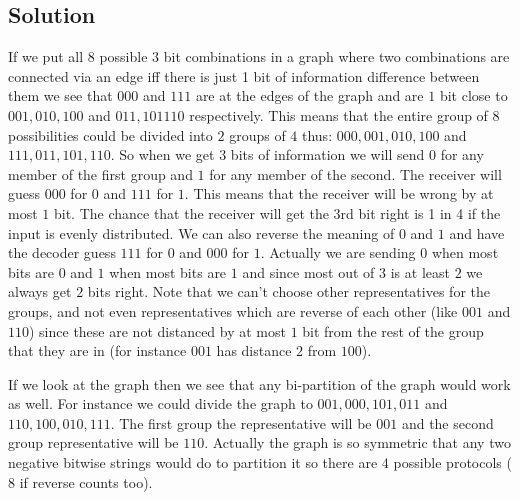 \documentclass{article}
\begin{document}
\subsection{Solution}
If we put all $8$ possible $3$ bit combinations in a graph where two combinations are connected via an edge iff there is just 1 bit of information difference between them we see that $000$ and $111$ are at the edges of the graph and are $1$ bit close to $001, 010, 100$ and $011, 101 110$ respectively. This means that the entire group of $8$ possibilities could be divided into $2$ groups of $4$ thus: $000, 001, 010, 100$ and $111, 011, 101, 110$. So when we get $3$ bits of information we will send $0$ for any member of the first group and $1$ for any member of the second. The receiver will guess $000$ for $0$ and $111$ for $1$. This means that the receiver will be wrong by at most $1$ bit. The chance that the receiver will get the 3rd bit right is 1 in 4 if the input is evenly distributed. We can also reverse the meaning of $0$ and $1$ and have the decoder guess $111$ for $0$ and $000$ for $1$. Actually we are sending $0$ when most bits are $0$ and $1$ when most bits are $1$ and since most out of $3$ is at least $2$ we always get $2$ bits right. Note that we can't choose other representatives for the groups, and not even representatives which are reverse of each other (like $001$ and $110$) since these are not distanced by at most $1$ bit from the rest of the group that they are in (for instance $001$ has distance $2$ from $100$).

\begin{center}
\end{center}

If we look at the graph then we see that any bi-partition of the graph would work as well. For instance we could divide the graph to $001, 000, 101, 011$ and $110, 100, 010, 111$. The first group the representative will be $001$ and the second group representative will be $110$. Actually the graph is so symmetric that any two negative bitwise strings would do to partition it so there are $4$ possible protocols ($8$ if reverse counts too).
\end{document}
